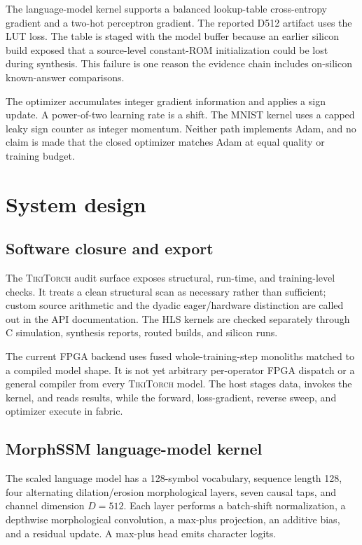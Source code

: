 \documentclass[10pt]{article}
\newcommand{\tikitorch}{\textsc{TikiTorch}}
\begin{document}
The language-model kernel supports a balanced lookup-table cross-entropy
gradient and a two-hot perceptron gradient.  The reported D512 artifact uses
the LUT loss.  The table is staged with the model buffer because an earlier
silicon build exposed that a source-level constant-ROM initialization could be
lost during synthesis.  This failure is one reason the evidence chain includes
on-silicon known-answer comparisons.

The optimizer accumulates integer gradient information and applies a sign
update.  A power-of-two learning rate is a shift.  The MNIST kernel uses a
capped leaky sign counter as integer momentum.  Neither path implements Adam,
and no claim is made that the closed optimizer matches Adam at equal quality or
training budget.

\section{System design}

\subsection{Software closure and export}

The \tikitorch{} audit surface exposes structural, run-time, and training-level
checks.  It treats a clean structural scan as necessary rather than sufficient;
custom source arithmetic and the dyadic eager/hardware distinction are called
out in the API documentation.  The HLS kernels are checked separately through
C simulation, synthesis reports, routed builds, and silicon runs.

The current FPGA backend uses fused whole-training-step monoliths matched to a
compiled model shape.  It is not yet arbitrary per-operator FPGA dispatch or a
general compiler from every \tikitorch{} model.  The host stages data, invokes
the kernel, and reads results, while the forward, loss-gradient, reverse sweep,
and optimizer execute in fabric.

\subsection{MorphSSM language-model kernel}

The scaled language model has a 128-symbol vocabulary, sequence length 128,
four alternating dilation/erosion morphological layers, seven causal taps, and
channel dimension $D=512$.  Each layer performs a batch-shift normalization, a
depthwise morphological convolution, a max-plus projection, an additive bias,
and a residual update.  A max-plus head emits character logits.
\end{document}

